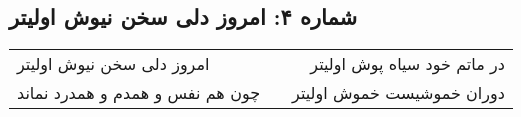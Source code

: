 \begin{center}
\section*{شماره ۴: امروز دلی سخن نیوش اولیتر}
\label{sec:004}
\begin{longtable}{l p{0.5cm} r}
امروز دلی سخن نیوش اولیتر
&&
در ماتم خود سیاه پوش اولیتر
\\
چون هم نفس و همدم و همدرد نماند
&&
دوران خموشیست خموش اولیتر
\\
\end{longtable}
\end{center}
